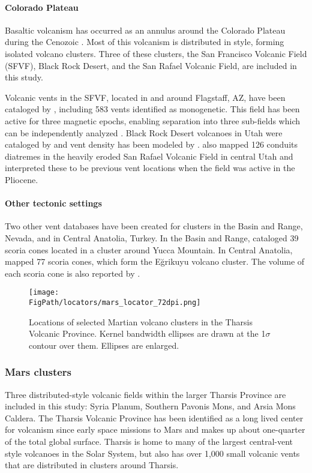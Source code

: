 \paragraph{Colorado Plateau} Basaltic volcanism has occurred as an annulus around the Colorado Plateau during the Cenozoic \citep{tanaka1986migration}. Most of this volcanism is distributed in style, forming isolated volcano clusters. Three of these clusters, the San Francisco Volcanic Field (SFVF), Black Rock Desert, and the San Rafael Volcanic Field, are included in this study. 

Volcanic vents in the SFVF, located in and around Flagstaff, AZ, have been cataloged by \citet{harburger2014probabilistic}, including 583 vents identified as monogenetic. This field has been active for three magnetic epochs, enabling separation into three sub-fields which can be independently analyzed \citep{tanaka1986migration}. Black Rock Desert volcanoes in Utah were cataloged by \citet{hintz2008physical} and vent density has been modeled by \citet{kiyosugi2012relationship}. \citet{kiyosugi2012relationship} also mapped 126 conduits diatremes in the heavily eroded San Rafael Volcanic Field in central Utah and interpreted these to be previous vent locations when the field was active in the Pliocene.

\paragraph{Other tectonic settings} Two other vent databases have been created for clusters in the Basin and Range, Nevada, and in Central Anatolia, Turkey. In the Basin and Range, \citet{connor1995three} cataloged 39 scoria cones located in a cluster around Yucca Mountain. In Central Anatolia, \citet{uslular2015size} mapped 77 scoria cones, which form the E\u{g}rikuyu volcano cluster. The volume of each scoria cone is also reported by \citet{uslular2015size}.

\begin{figure}
\centering
\texttt{[image: \\FigPath/locators/mars\_locator\_72dpi.png]}
\caption[Locations of selected Martian volcano clusters in the Tharsis Volcanic Province]{Locations of selected Martian volcano clusters in the Tharsis Volcanic Province. Kernel bandwidth ellipses are drawn at the 1$\sigma$ contour over them. Ellipses are enlarged.}
\label{fig_marslocator}
\end{figure}

\subsubsection{Mars clusters}
Three distributed-style volcanic fields within the larger Tharsis Province are included in this study: Syria Planum, Southern Pavonis Mons, and Arsia Mons Caldera. The Tharsis Volcanic Province has  been identified as a long lived center for volcanism since early space missions to Mars \citep{carr1977some} and makes up about one-quarter of the total global surface. Tharsis is home to many of the largest central-vent style volcanoes in the Solar System, but also has over 1,000 small volcanic vents that are distributed in clusters around Tharsis.

